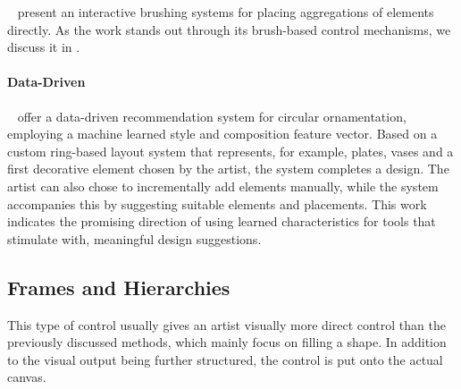 \citeauthor*{hsu_2020_aef}~\cite{hsu_2020_aef} present an interactive brushing systems for placing aggregations of elements directly. As the work stands out through its brush-based control mechanisms, we discuss it in .


\paragraph*{Data-Driven}
\label{para:analysis_element_arrangements_datadriven}

\citeauthor*{phan_2016_ple}~\cite{phan_2016_ple} offer a data-driven recommendation system for circular ornamentation, employing a machine learned style and composition feature vector. Based on a custom ring-based layout system that represents, for example, plates, vases and a first decorative element chosen by the artist, the system completes a design. The artist can also chose to incrementally add elements manually, while the system accompanies this by suggesting suitable elements and placements. This work indicates the promising direction of using learned characteristics for tools that stimulate with, \eg meaningful design suggestions.


\subsection{Frames and Hierarchies}
\label{subsec:analysis_frames_and_hierarchies}

 This type of control usually gives an artist visually more direct control than the previously discussed methods, which mainly focus on filling a shape. In addition to the visual output being further structured, the control is put onto the actual canvas.

